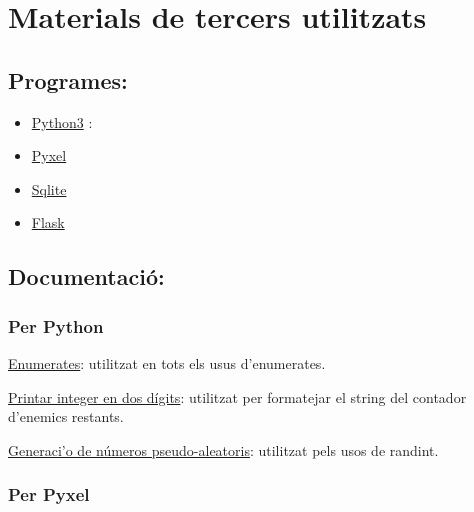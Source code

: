 
\section{Materials de tercers utilitzats}

\subsection{Programes:}
\begin{itemize}
\item{ \href{https://python.org/}{Python3} }:

\item{ \href{https://github.com/kitao/pyxel}{Pyxel} }
\item{ \href{https://sqlite.org/}{Sqlite} }
\item{ \href{https://github.com/pallets/flask}{Flask} }

\end{itemize}


\subsection{Documentaci\'o:}

\subsubsection*{Per Python}
\begin{itemize}
\begin{item}
\href{https://docs.python.org/3/library/enum.html}
{Enumerates}:
utilitzat en tots els usus d'enumerates.
\end{item}

\begin{item}
\href{https://stackoverflow.com/questions/64094654/python-converting-letter-to-two-digit-number}
{Printar integer en dos d\'igits}:
utilitzat per formatejar el string del contador d'enemics restants.
\end{item}

\begin{item}
\href{https://docs.python.org/3/library/random.html}
{Generaci'o de n\'umeros pseudo-aleatoris}:
utilitzat pels usos de randint.
\end{item}
\end{itemize}


\subsubsection*{Per Pyxel}


